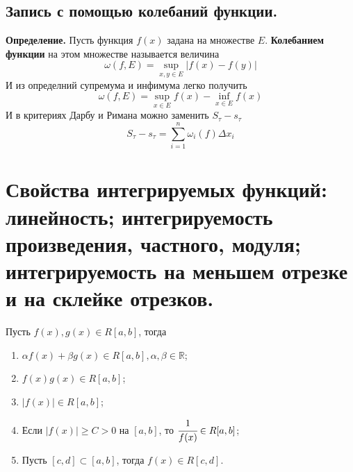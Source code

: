 \documentclass{article}
\newcommand*{\definition}[1]{\textbf{Определение.} #1 \newline}
\newcommand*{\R}{\mathbb{R}}
\begin{document}
\subsection{Запись с помощью колебаний функции.}
\definition{Пусть функция $f(x)$ задана на множестве $E$. \textbf{Колебанием функции} на этом множестве называется величина}
$$
    \omega(f, E) = \displaystyle \sup_{x, y \in E}|f(x) - f(y)|
$$
И из определний супремума и инфимума легко получить 
$$
    \omega(f, E) = \displaystyle \sup_{x \in E}f(x) - \inf_{x \in E}f(x)
$$
И в критериях Дарбу и Римана можно заменить $S_\tau - s_\tau$
$$
    S_\tau - s_\tau = \sum_{i = 1}^{n}\omega_i(f)\Delta x_i
$$
\section{Свойства интегрируемых функций: линейность; интегрируемость произведения, частного, модуля; интегрируемость на меньшем отрезке и на склейке отрезков.}
Пусть $f(x), g(x) \in R[a, b]$, тогда 
\begin{enumerate}
    \item $\alpha f(x) + \beta g(x) \in R[a, b], \alpha, \beta \in \R$;
    \item $f(x)g(x) \in R[a, b]$;
    \item $|f(x)| \in R[a, b]$;
    \item Если $|f(x)| \geq C > 0$ на $[a, b]$, то $\cfrac{1}{f(x)} \in R[a, b]$;
    \item Пусть $[c, d] \subset [a, b]$, тогда $f(x) \in R[c, d]$.
\end{enumerate}
\end{document}
